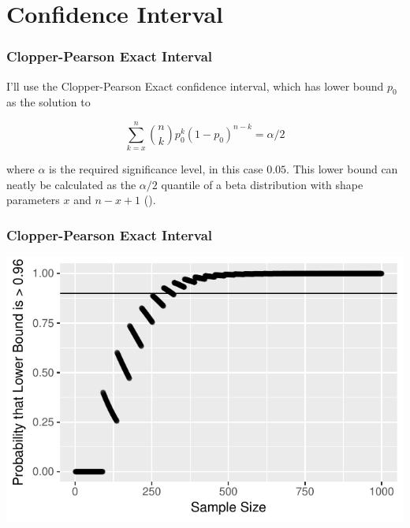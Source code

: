 \documentclass{beamer}\usepackage{knitr}
\begin{document}
\section{Confidence Interval}

\begin{frame}
\frametitle{Clopper-Pearson Exact Interval}

I'll use the Clopper-Pearson Exact confidence interval, which has lower bound $p_0$ as the solution to

\begin{equation*}
\sum_{k = x}^{n}{\binom{n}{k}p_0^k(1-p_0)^{n-k}} = \alpha / 2
\end{equation*}

where $\alpha$ is the required significance level, in this case $0.05$. This lower bound can neatly be calculated as the $\alpha/2$ quantile of a beta distribution with shape parameters $x$ and $n - x + 1$ (\cite{Agresti1998}).
\end{frame}

\begin{frame}
\frametitle{Clopper-Pearson Exact Interval}
\begin{knitrout}
\color{fgcolor}

{\centering \includegraphics[width=\linewidth]{figure/plot_Exact_1-1} 

}



\end{knitrout}
\end{frame}
\end{document}
